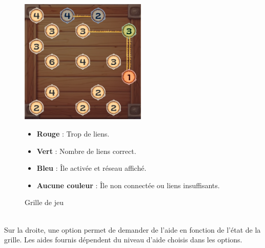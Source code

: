 \begin{figure}[h]
    \centering
    \begin{minipage}{0.4\textwidth}
        \includegraphics[width=6cm]{../Annexe/Screen/Grille.png}
        \caption{Grille de jeu}
    \end{minipage}%
    \hfill
    \begin{minipage}{0.55\textwidth}
        
        \begin{itemize}
            \item \textbf{Rouge} : Trop de liens.
            \item \textbf{Vert} : Nombre de liens correct.
            \item \textbf{Bleu} : Île activée et réseau affiché.
            \item \textbf{Aucune couleur} : Île non connectée ou liens insuffisants.
        \end{itemize}
    \end{minipage}
\end{figure}
\\
Sur la droite, une option permet de demander de l'aide en fonction de l'état de la grille. Les aides fournis dépendent du niveau d'aide choisis dans les options.

